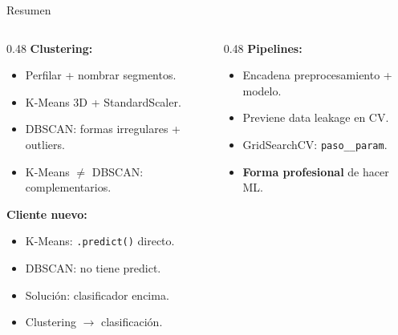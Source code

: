 \documentclass[aspectratio=169, 11pt]{beamer}
\begin{document}
\begin{frame}[shrink=10]{Resumen}
  \vspace{-4pt}
  \begin{columns}[T]
    \begin{column}{0.48\textwidth}
      {\footnotesize\bfseries\color{arcaRed} Clustering:}
      \vspace{4pt}

      {\footnotesize
      \begin{itemize}\setlength{\itemsep}{3pt}
        \item[{\color{codeGreen}\faCheckCircle}]
          Perfilar + nombrar segmentos.
        \item[{\color{codeGreen}\faCheckCircle}]
          K-Means 3D + StandardScaler.
        \item[{\color{codeGreen}\faCheckCircle}]
          DBSCAN: formas irregulares + outliers.
        \item[{\color{codeGreen}\faCheckCircle}]
          K-Means $\neq$ DBSCAN: complementarios.
      \end{itemize}
      }

      \vspace{4pt}
      {\footnotesize\bfseries\color{codeBlue} Cliente nuevo:}
      \vspace{4pt}

      {\footnotesize
      \begin{itemize}\setlength{\itemsep}{3pt}
        \item[{\color{codeBlue}\faCheckCircle}]
          K-Means: \texttt{.predict()} directo.
        \item[{\color{codeBlue}\faCheckCircle}]
          DBSCAN: no tiene predict.
        \item[{\color{codeBlue}\faCheckCircle}]
          Soluci\'on: clasificador encima.
        \item[{\color{codeBlue}\faCheckCircle}]
          Clustering $\to$ clasificaci\'on.
      \end{itemize}
      }
    \end{column}

    \begin{column}{0.48\textwidth}
      {\footnotesize\bfseries\color{codeGreen} Pipelines:}
      \vspace{4pt}

      {\footnotesize
      \begin{itemize}\setlength{\itemsep}{3pt}
        \item[{\color{codeGreen}\faCheckCircle}]
          Encadena preprocesamiento + modelo.
        \item[{\color{codeGreen}\faCheckCircle}]
          Previene data leakage en CV.
        \item[{\color{codeGreen}\faCheckCircle}]
          GridSearchCV: \texttt{paso\_\_param}.
        \item[{\color{codeGreen}\faCheckCircle}]
          \textbf{Forma profesional} de hacer ML.
      \end{itemize}
      }
    \end{column}
  \end{columns}


\end{frame}
\end{document}
